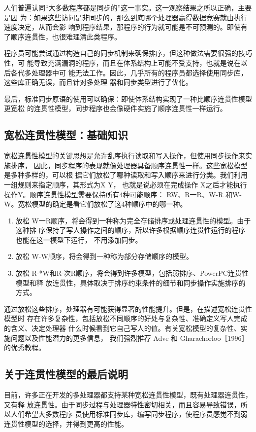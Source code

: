 人们普遍认同“大多数程序都是同步的”这一事实。这一观察结果之所以正确，主要是因
为：如果这些访问是非同步的，那么到底哪个处理器赢得数据竞赛就由执行速度决定，从而会影
响到程序结果，那程序的行为就可能是不可预测的。即使有了顺序连贯性，也很难理清此类程序。

程序员可能尝试通过构造自己的同步机制来确保排序，但这种做法需要很强的技巧性，可
能导致充满漏洞的程序，而且在体系结构上可能不受支持，也就是说在以后各代多处理器中可
能无法工作。因此，几乎所有的程序员都选择使用同步库，这些库正确无误，而且针对多处理
器和同步类型进行了优化。

最后，标准同步原语的使用可以确保：即使体系结构实现了一种比顺序连贯性模型更宽松
的连贯性模型，同步程序也会像硬件实施了顺序连贯性一样运行。

\subsection{宽松连贯性模型：基础知识}
宽松连贯性模型的关键思想是允许乱序执行读取和写入操作，但使用同步操作来实施排序，
因此，同步程序的表现就像处理器具备顺序连贯性一样。这些宽松模型是多种多样的，可以根
据它们放松了哪种读取和写入顺序来进行分类。我们利用一组规则来指定顺序，其形式为X Y，
也就是说必须在完成操作 X之后才能执行操作Y。顺序连贯性模型需要保持所有4种可能顺序：
RW、R一R、W-R 和W-W。宽松模型的确定是看它们放松了这4种顺序中的哪一种。

\begin{enumerate}
    \item 放松 W一R顺序，将会得到一种称为完全存储排序或处理连贯性的模型。由于这种排
    序保持了写人操作之间的顺序，所以许多根据顺序连贯性运行的程序也能在这一模型下运行，
    不用添加同步。
    \item 放松 W-W顺序，将会得到一种称为部分存储顺序的模型。
    \item 放松 R-*W和R-次R顺序，将会得到许多模型，包括弱排序、PowerPC连贯性模型和释
    放连贯性，具体取决于排序约束条件的细节和同步操作实施排序的方式。
\end{enumerate}
通过放松这些排序，处理器有可能获得显著的性能提升。但是，在描述宽松连贯性模型时
存在许多复杂性，包括放松不同顺序的好处与复杂性、准确定义写人完成的含义、决定处理器
什么时候看到它自己写人的值。有关宽松模型的复杂性、实施问题以及性能潜力的更多信息，
我们强烈推荐 Adve 和 Gharachorloo［1996］的优秀教程。

\subsection{关于连贯性模型的最后说明}
目前，许多正在开发的多处理器都支持某种宽松连贯性模型，既有处理器连贯性，又有释
放连贯性。由于同步过程与处理器特性密切相关，而且容易导致错误，所以人们希望大多数程序
员使用标准同步库，编写同步程序，使程序员感觉不到弱连贯性模型的选择，并得到更高的性能。

